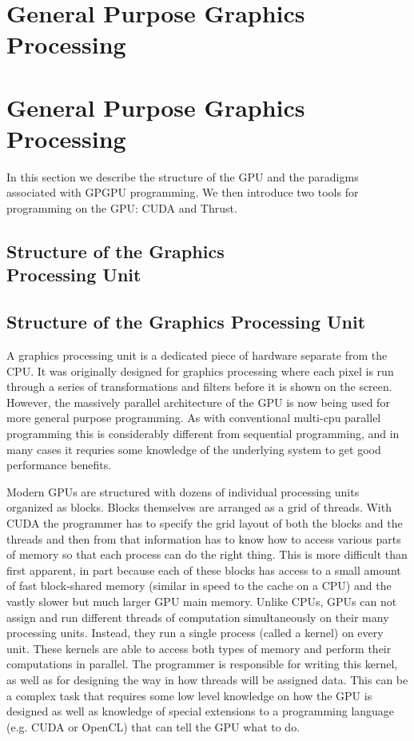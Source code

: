 \documentclass[twocolumn]{article}
\renewcommand{\|}{\origbar} %
\begin{document}
\if@twocolumn
  \section{General Purpose Graphics \\ Processing}
\else
  \section{General Purpose Graphics Processing}
\fi 
\label{sec:GPGP}

In this section we describe the structure of the GPU and the paradigms associated with GPGPU programming. We then introduce two tools for programming on the GPU: CUDA and Thrust.

\if@twocolumn
  \subsection{Structure of the Graphics \\ Processing Unit}
\else
  \subsection{Structure of the Graphics Processing Unit}
\fi

A graphics processing unit is a dedicated piece of hardware separate from the CPU. It was originally designed for graphics processing where each pixel is run through a series of transformations and filters before it is shown on the screen. However, the massively parallel architecture of the GPU is now being used for more general purpose programming. As with conventional multi-cpu parallel programming this is considerably different from sequential programming, and in many cases it requries some knowledge of the underlying system to get good performance benefits. 

Modern GPUs are structured with dozens of individual processing units organized as blocks. Blocks themselves are arranged as a grid of threads. With CUDA the programmer has to specify the grid layout of both the blocks and the threads and then from that information has to know how to access various parts of memory so that each process can do the right thing. This is more difficult than first apparent, in part because each of these blocks has access to a small amount of fast block-shared memory (similar in speed to the cache on a CPU) and the vastly slower but much larger GPU main memory. Unlike CPUs, GPUs can not assign and run different threads of computation simultaneously on their many processing units. Instead, they run a single process (called a kernel) on every unit. These kernels are able to access both types of memory and perform their computations in parallel. The programmer is responsible for writing this kernel, as well as for designing the way in how threads will be assigned data. This can be a complex task that requires some low level knowledge on how the GPU is designed as well as knowledge of special extensions to a programming language (e.g. CUDA or OpenCL) that can tell the GPU what to do.
\end{document}
